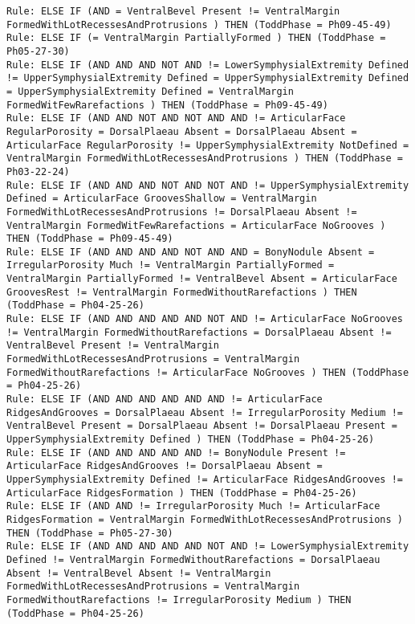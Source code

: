 \begin{lstlisting}
Rule: ELSE IF (AND = VentralBevel Present != VentralMargin FormedWithLotRecessesAndProtrusions ) THEN (ToddPhase = Ph09-45-49)
Rule: ELSE IF (= VentralMargin PartiallyFormed ) THEN (ToddPhase = Ph05-27-30)
Rule: ELSE IF (AND AND AND NOT AND != LowerSymphysialExtremity Defined != UpperSymphysialExtremity Defined = UpperSymphysialExtremity Defined = UpperSymphysialExtremity Defined = VentralMargin FormedWitFewRarefactions ) THEN (ToddPhase = Ph09-45-49)
Rule: ELSE IF (AND AND NOT AND NOT AND AND != ArticularFace RegularPorosity = DorsalPlaeau Absent = DorsalPlaeau Absent = ArticularFace RegularPorosity != UpperSymphysialExtremity NotDefined = VentralMargin FormedWithLotRecessesAndProtrusions ) THEN (ToddPhase = Ph03-22-24)
Rule: ELSE IF (AND AND AND NOT AND NOT AND != UpperSymphysialExtremity Defined = ArticularFace GroovesShallow = VentralMargin FormedWithLotRecessesAndProtrusions != DorsalPlaeau Absent != VentralMargin FormedWitFewRarefactions = ArticularFace NoGrooves ) THEN (ToddPhase = Ph09-45-49)
Rule: ELSE IF (AND AND AND AND NOT AND AND = BonyNodule Absent = IrregularPorosity Much != VentralMargin PartiallyFormed = VentralMargin PartiallyFormed != VentralBevel Absent = ArticularFace GroovesRest != VentralMargin FormedWithoutRarefactions ) THEN (ToddPhase = Ph04-25-26)
Rule: ELSE IF (AND AND AND AND AND NOT AND != ArticularFace NoGrooves != VentralMargin FormedWithoutRarefactions = DorsalPlaeau Absent != VentralBevel Present != VentralMargin FormedWithLotRecessesAndProtrusions = VentralMargin FormedWithoutRarefactions != ArticularFace NoGrooves ) THEN (ToddPhase = Ph04-25-26)
Rule: ELSE IF (AND AND AND AND AND AND != ArticularFace RidgesAndGrooves = DorsalPlaeau Absent != IrregularPorosity Medium != VentralBevel Present = DorsalPlaeau Absent != DorsalPlaeau Present = UpperSymphysialExtremity Defined ) THEN (ToddPhase = Ph04-25-26)
Rule: ELSE IF (AND AND AND AND AND != BonyNodule Present != ArticularFace RidgesAndGrooves != DorsalPlaeau Absent = UpperSymphysialExtremity Defined != ArticularFace RidgesAndGrooves != ArticularFace RidgesFormation ) THEN (ToddPhase = Ph04-25-26)
Rule: ELSE IF (AND AND != IrregularPorosity Much != ArticularFace RidgesFormation = VentralMargin FormedWithLotRecessesAndProtrusions ) THEN (ToddPhase = Ph05-27-30)
Rule: ELSE IF (AND AND AND AND AND NOT AND != LowerSymphysialExtremity Defined != VentralMargin FormedWithoutRarefactions = DorsalPlaeau Absent != VentralBevel Absent != VentralMargin FormedWithLotRecessesAndProtrusions = VentralMargin FormedWithoutRarefactions != IrregularPorosity Medium ) THEN (ToddPhase = Ph04-25-26)

\end{lstlisting}
